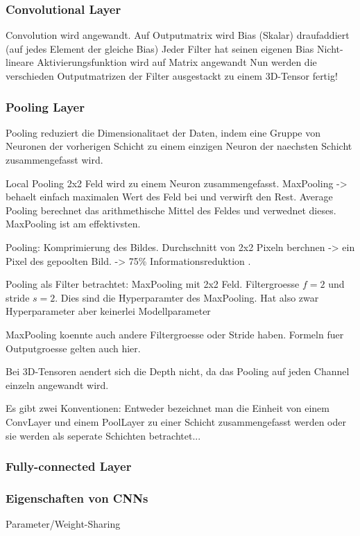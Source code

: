 \documentclass[../main]{subfiles}
\begin{document}
\subsubsection{Convolutional Layer}
Convolution wird angewandt.
Auf Outputmatrix wird Bias (Skalar) draufaddiert (auf jedes Element der gleiche Bias)
Jeder Filter hat seinen eigenen Bias
Nicht-lineare Aktivierungsfunktion wird auf Matrix angewandt
Nun werden die verschieden Outputmatrizen der Filter ausgestackt zu einem
3D-Tensor
fertig!

\subsubsection{Pooling Layer}
Pooling reduziert die Dimensionalitaet der Daten, indem eine Gruppe von Neuronen
der vorherigen Schicht zu einem einzigen Neuron der naechsten Schicht
zusammengefasst wird.

Local Pooling 2x2 Feld wird zu einem Neuron zusammengefasst. MaxPooling ->
behaelt einfach maximalen Wert des Feld bei und verwirft den Rest. Average
Pooling berechnet das arithmethische Mittel des Feldes und verwednet dieses.
MaxPooling ist am effektivsten.

Pooling:
Komprimierung des Bildes. Durchschnitt von 2x2 Pixeln berchnen -> ein Pixel des
gepoolten Bild. -> 75\% Informationsreduktion .

Pooling als Filter betrachtet:
MaxPooling mit 2x2 Feld. Filtergroesse $f=2$ und stride $s=2$. Dies sind die
Hyperparamter des MaxPooling. Hat also zwar Hyperparameter aber keinerlei Modellparameter

MaxPooling koennte auch andere Filtergroesse oder Stride haben. Formeln fuer
Outputgroesse gelten auch hier.

Bei 3D-Tensoren aendert sich die Depth nicht, da das Pooling auf jeden Channel
einzeln angewandt wird.


Es gibt zwei Konventionen:
Entweder bezeichnet man die Einheit von einem ConvLayer und einem PoolLayer zu
einer Schicht zusammengefasst werden oder sie werden als seperate Schichten betrachtet...

\subsubsection{Fully-connected Layer}

\subsubsection{Eigenschaften von CNNs}
Parameter/Weight-Sharing
\end{document}
